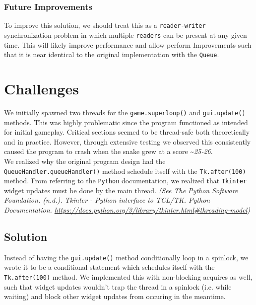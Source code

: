 \documentclass{article}
\begin{document}
\subsubsection{Future Improvements}

To improve this solution, we should treat this as a \texttt{reader-writer} synchronization problem in which multiple \texttt{readers} can be present at any given time. This will likely improve performance and allow perform Improvements
such that it is near identical to the original implementation with the \texttt{Queue}.

\section{Challenges}

We initially spawned two threads for the \texttt{game.superloop()} and \texttt{gui.update()} methods.
This was highly problematic since the program functioned as intended for initial gameplay. Critical sections seemed to be thread-safe both theoretically and in practice.
However, through extensive testing we observed this consistently caused the program to crash when the snake grew at a score \textasciitilde \textit{25-26}. \\

We realized why the original program design had the \texttt{QueueHandler.queueHandler()} method schedule itself with the \texttt{Tk.after(100)} method.
From referring to the \texttt{Python} documentation, we realized that \texttt{Tkinter} widget updates must be done by the main thread.
\textit{(See The Python Software Foundation. (n.d.). Tkinter - Python interface to TCL/TK. Python Documentation. \href{https://docs.python.org/3/library/tkinter.html\#threading-model}{https://docs.python.org/3/library/tkinter.html\#threading-model})}

\subsection{Solution}

Instead of having the \texttt{gui.update()} method conditionally loop in a spinlock, we wrote it to be a conditional statement which schedules itself with the \texttt{Tk.after(100)} method.
We implemented this with non-blocking acquires as well, such that widget updates wouldn't trap the thread in a spinlock (i.e. while waiting) and block other widget updates from occuring in the meantime.
\end{document}
